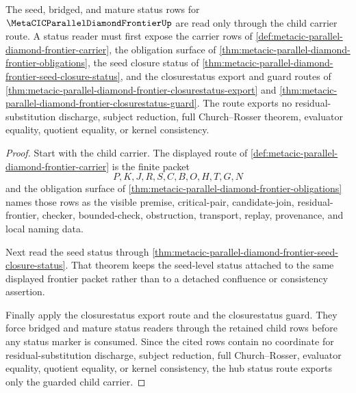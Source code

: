 \begin{theorem}
\label{thm:metacic-parallel-diamond-frontier-hub-child-status-route}
The seed, bridged, and mature status rows for $\MetaCICParallelDiamondFrontierUp$ are read only through the child carrier route. A status reader must first expose the carrier rows of \autoref{def:metacic-parallel-diamond-frontier-carrier}, the obligation surface of \autoref{thm:metacic-parallel-diamond-frontier-obligations}, the seed closure status of \autoref{thm:metacic-parallel-diamond-frontier-seed-closure-status}, and the closurestatus export and guard routes of \autoref{thm:metacic-parallel-diamond-frontier-closurestatus-export} and \autoref{thm:metacic-parallel-diamond-frontier-closurestatus-guard}. The route exports no residual-substitution discharge, subject reduction, full Church--Rosser theorem, evaluator equality, quotient equality, or kernel consistency.
\end{theorem}
\begin{proof}
Start with the child carrier. The displayed route of \autoref{def:metacic-parallel-diamond-frontier-carrier} is the finite packet
$$
P,K,J,R,S,C,B,O,H,T,G,N
$$
and the obligation surface of \autoref{thm:metacic-parallel-diamond-frontier-obligations} names those rows as the visible premise, critical-pair, candidate-join, residual-frontier, checker, bounded-check, obstruction, transport, replay, provenance, and local naming data.

Next read the seed status through \autoref{thm:metacic-parallel-diamond-frontier-seed-closure-status}. That theorem keeps the seed-level status attached to the same displayed frontier packet rather than to a detached confluence or consistency assertion.

Finally apply the closurestatus export route and the closurestatus guard. They force bridged and mature status readers through the retained child rows before any status marker is consumed. Since the cited rows contain no coordinate for residual-substitution discharge, subject reduction, full Church--Rosser, evaluator equality, quotient equality, or kernel consistency, the hub status route exports only the guarded child carrier.
\end{proof}
